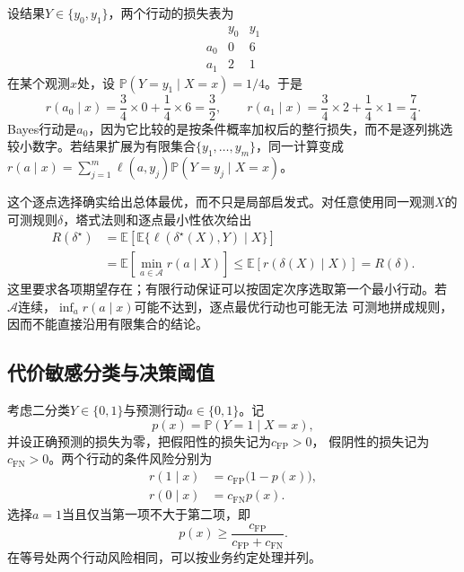 \begin{example}[有限损失表的逐项计算]
\label{ex:decision-finite-loss-table}
设结果\(Y\in\{y_0,y_1\}\)，两个行动的损失表为
\[
  \begin{array}{c|cc}
    &y_0&y_1\\ \hline
    a_0&0&6\\
    a_1&2&1
  \end{array}
\]
在某个观测\(x\)处，设
\(\mathbb{P}(Y=y_1\mid X=x)=1/4\)。于是
\[
  r(a_0\mid x)
  =
  \frac34\times0+\frac14\times6
  =
  \frac32,
  \qquad
  r(a_1\mid x)
  =
  \frac34\times2+\frac14\times1
  =
  \frac74.
\]
Bayes行动是\(a_0\)，因为它比较的是按条件概率加权后的整行损失，而不是逐列挑选
较小数字。若结果扩展为有限集合\(\{y_1,\ldots,y_m\}\)，同一计算变成
\(r(a\mid x)=\sum_{j=1}^m\ell(a,y_j)
\mathbb{P}(Y=y_j\mid X=x)\)。
\end{example}

这个逐点选择确实给出总体最优，而不只是局部启发式。对任意使用同一观测\(X\)的
可测规则\(\delta\)，塔式法则和逐点最小性依次给出
\begin{align*}
  R(\delta^\star)
  &=
  \mathbb{E}\left[
    \mathbb{E}\{\ell(\delta^\star(X),Y)\mid X\}
  \right]\\
  &=
  \mathbb{E}\left[\min_{a\in\mathcal{A}}r(a\mid X)\right]
  \leq
  \mathbb{E}\left[r(\delta(X)\mid X)\right]
  =
  R(\delta).
\end{align*}
这里要求各项期望存在；有限行动保证可以按固定次序选取第一个最小行动。若
\(\mathcal{A}\)连续，\(\inf_a r(a\mid x)\)可能不达到，逐点最优行动也可能无法
可测地拼成规则，因而不能直接沿用有限集合的结论。

\subsection{代价敏感分类与决策阈值}
考虑二分类\(Y\in\{0,1\}\)与预测行动\(a\in\{0,1\}\)。记
\[
  p(x)=\mathbb{P}(Y=1\mid X=x),
\]
并设正确预测的损失为零，把假阳性的损失记为\(c_{\mathrm{FP}}>0\)，
假阴性的损失记为\(c_{\mathrm{FN}}>0\)。两个行动的条件风险分别为
\begin{align}
  r(1\mid x)
  &=
  c_{\mathrm{FP}}\bigl(1-p(x)\bigr),
  \label{eq:decision-binary-risk-positive}\\
  r(0\mid x)
  &=
  c_{\mathrm{FN}}p(x).
  \label{eq:decision-binary-risk-negative}
\end{align}
选择\(a=1\)当且仅当第一项不大于第二项，即
\begin{equation}
  p(x)
  \geq
  \frac{c_{\mathrm{FP}}}
       {c_{\mathrm{FP}}+c_{\mathrm{FN}}}.
  \label{eq:decision-cost-sensitive-threshold}
\end{equation}
在等号处两个行动风险相同，可以按业务约定处理并列。

